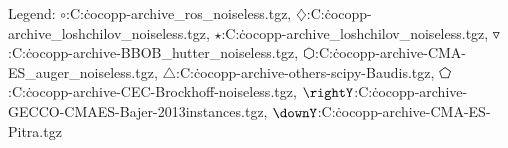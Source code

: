 Legend: {\color{NavyBlue}$\circ$}:C:\Users\dimo\.cocopp\data-archive\bbob{}\NEWUOA\_ros\_noiseless.tgz, {\color{Magenta}$\diamondsuit$}:C:\Users\dimo\.cocopp\data-archive\bbob{}\BIPOPsaACM\_loshchilov\_noiseless.tgz, {\color{Orange}$\star$}:C:\Users\dimo\.cocopp\data-archive\bbob{}\HCMA\_loshchilov\_noiseless.tgz, {\color{CornflowerBlue}$\triangledown$}:C:\Users\dimo\.cocopp\data-archive\bbob{}\SMAC-BBOB\_hutter\_noiseless.tgz, {\color{red}$\varhexagon$}:C:\Users\dimo\.cocopp\data-archive\bbob{}\lmm-CMA-ES\_auger\_noiseless.tgz, {\color{YellowGreen}$\triangle$}:C:\Users\dimo\.cocopp\data-archive\bbob{}-others\SLSQP-scipy-Baudis.tgz, {\color{cyan}$\pentagon$}:C:\Users\dimo\.cocopp\data-archive\bbob{}-CEC\MATSUMOTO-Brockhoff-noiseless.tgz, {\color{GreenYellow}$\rightY$}:C:\Users\dimo\.cocopp\data-archive\bbob{}-GECCO-CMAES-Bajer-2013instances.tgz, {\color{ForestGreen}$\downY$}:C:\Users\dimo\.cocopp\data-archive\bbob{}\DTS-CMA-ES-Pitra.tgz